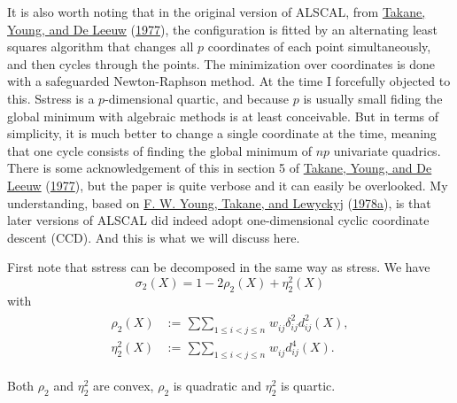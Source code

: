 \documentclass[
  12pt,
]{book}
\theoremstyle{definition}
\theoremstyle{definition}
\theoremstyle{definition}
\theoremstyle{definition}
\theoremstyle{remark}
\begin{document}
It is also worth noting that in the original version of ALSCAL, from \protect\hyperlink{ref-takane_young_deleeuw_A_77}{Takane, Young, and De Leeuw} (\protect\hyperlink{ref-takane_young_deleeuw_A_77}{1977}), the configuration is fitted by an alternating least squares algorithm that changes all \(p\) coordinates of each point simultaneously, and then cycles through the points. The minimization over coordinates is done with a safeguarded Newton-Raphson method. At the time I forcefully objected to this. Sstress is a
\(p\)-dimensional quartic, and because \(p\) is usually small fiding the global minimum with algebraic methods is at least conceivable. But in terms of simplicity, it is much better to change a single coordinate at the time, meaning that one cycle consists of finding the global minimum of \(np\) univariate quadrics. There is some acknowledgement of this in section 5 of \protect\hyperlink{ref-takane_young_deleeuw_A_77}{Takane, Young, and De Leeuw} (\protect\hyperlink{ref-takane_young_deleeuw_A_77}{1977}), but the paper is quite verbose and it can easily be overlooked. My understanding, based on \protect\hyperlink{ref-young_takane_lewyckyj_78a}{F. W. Young, Takane, and Lewyckyj} (\protect\hyperlink{ref-young_takane_lewyckyj_78a}{1978a}), is that later versions of ALSCAL did indeed adopt one-dimensional cyclic coordinate descent (CCD). And this is what we will discuss here.

First note that sstress can be decomposed in the same way as stress. We have
\begin{equation}
\sigma_2(X)=1-2\rho_2(X)+\eta_2^2(X)
\label{eq:sstressdec}
\end{equation}
with
\begin{align}
\begin{split}
\rho_2(X)&:=\mathop{\sum\sum}_{1\leq i < j\leq n} w_{ij}^{\ }\delta_{ij}^2d_{ij}^2(X),\\
\eta_2^2(X)&:=\mathop{\sum\sum}_{1\leq i < j\leq n} w_{ij}^{\ }d_{ij}^4(X).
\end{split} 
\label{eq:sstresstwo}
\end{align}

Both \(\rho_2\) and \(\eta_2^2\) are convex, \(\rho_2\) is quadratic and \(\eta^2_2\) is
quartic.
\end{document}

